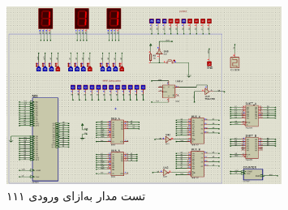 \documentclass[12pt,onecolumn,a4paper,fleqn]{article}
\begin{document}
	\begin{figure}[H]
		\centering
		\includegraphics[width=0.8\textwidth]{source/test-111.png}
		\caption{تست مدار به‌ازای ورودی ۱۱۱}
	\end{figure}
\end{document}
